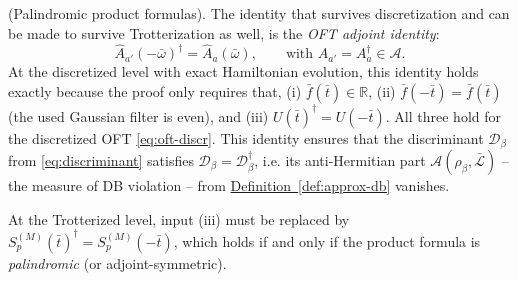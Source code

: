 \begin{remark} \label{rem:palindromic}
    \textup{(Palindromic product formulas).} The identity that survives discretization and can be made to survive Trotterization as well, is the \emph{OFT adjoint identity}:
    $$
    \hat{A}_{a'}(-\bar{\omega})^\dagger = \hat{A}_a(\bar{\omega}), \qquad \text{with } A_{a'} = A_a^\dagger \in \mathcal{A}.
    $$
    At the discretized level with exact Hamiltonian evolution, this identity holds exactly because the proof only requires that, (i) $\bar{f}(\bar{t}) \in \mathbb{R}$, (ii) $\bar{f}(-\bar{t}) = \bar{f}(\bar{t})$ (the used Gaussian filter is even), and (iii) $U(\bar{t})^\dagger = U(-\bar{t})$. All three hold for the discretized OFT \eqref{eq:oft-discr}. This identity ensures that the discriminant $\mathcal{D}_\beta$ from \eqref{eq:discriminant} satisfies $\mathcal{D}_\beta = \mathcal{D}_\beta^\dagger$, i.e. its anti-Hermitian part $\mathcal{A}(\rho_\beta, \mathcal{\bar{L}})$
    -- the measure of DB violation -- from \hyperref[def:approx-db]{Definition~\ref*{def:approx-db}} vanishes.

    At the Trotterized level, input (iii) must be replaced by $S_p^{(M)}(\bar{t})^\dagger = S_p^{(M)}(-\bar{t})$, which holds if and only if the product formula is \emph{palindromic} (or adjoint-symmetric).
\end{remark}
